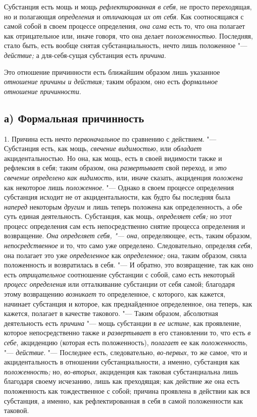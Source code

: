 Субстанция есть мощь и мощь
{\em рефлектированная в себя}, не просто переходящая,
но и полагающая {\em определения} и
{\em отличающая их от себя}. Как соотносящаяся с самой
собой в своем процессе определения, {\em она сама} есть
то, что она полагает как отрицательное или, иначе говоря, что она делает
{\em положенностью}. Последняя, стало быть, есть вообще
снятая субстанциальность, нечто лишь положенное
"--- {\em действие;} а для-себя-сущая субстанция есть {\em причина}.

Это отношение причинности есть ближайшим образом лишь указанное
{\em отношение причины и действия;} таким образом, оно
есть {\em формальное отношение причинности}.


\subsection[а) Формальная причинность]{а) Формальная причинность}

1. Причина есть нечто {\em первоначальное} по сравнению с действием. "---
Субстанция есть, как мощь, {\em свечение видимостью},
или {\em обладает} акцидентальностью. Но она, как мощь,
есть в своей видимости также и рефлексия в себя; таким образом, она
{\em развертывает} свой переход, и
{\em это свечение определено как видимость}, или, иначе
сказать, акциденция {\em положена} как некоторое лишь
{\em положенное}. "--- Однако в своем процессе определения
субстанция исходит не от акцидентальности, как будто бы последняя была
{\em наперед} некоторым {\em другим} и лишь теперь положена как определенность,
а обе суть единая деятельность. Субстанция, как мощь,
{\em определяет себя;} но этот процесс определения сам
есть непосредственно снятие процесса определения и возвращение.
{\em Она определяет себя, "--- она}, определяющее, есть,
таким образом, {\em непосредственное} и то, что само
уже определено. Следовательно, определяя {\em себя},
она полагает это уже {\em определенное} как
{\em определенное;} она, таким образом, сняла
положенность и возвратилась в себя. "--- И обратно, это возвращение, так как
оно есть {\em отрицательное} соотношение субстанции с
собой, само есть некоторый {\em процесс определения}
или отталкивание субстанции от себя самой; благодаря этому возвращению
{\em возникает} то определенное, с которого, как
кажется, начинает субстанция и которое, как преднайденное определенное, она
теперь, как кажется, полагает в качестве такового. "--- Таким образом,
абсолютная деятельность есть {\em причина} "--- мощь
субстанции в {\em ее истине}, как проявление, которое
непосредственно также и {\em развертывает} в его
становлении то, что есть {\em в себе}, акциденцию
(которая есть положенность), {\em полагает} ее как {\em положенность}, "---
{\em действие}. "--- Последнее есть, следовательно,
{\em во-первых}, то же самое, что и акцидентальность в
отношении субстанциальности, а именно, субстанция как {\em положенность;}
но, {\em во-вторых}, акциденция как таковая субстанциальна
лишь благодаря своему исчезанию, лишь как преходящая; как действие же она
есть положенность как тождественное с собой; причина проявлена в действии
как вся субстанция, а именно, как рефлектированная в себя в самой
положенности как таковой.

